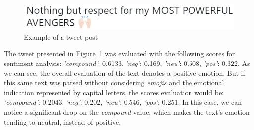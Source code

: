 
\begin{figure}[htb]
    \begin{center}
        \includegraphics[width=0.8\linewidth]{img/Twitter1.png}
    \end{center}
       \caption{Example of a tweet post} %
    \label{fig:tweet1}
\end{figure}

The tweet presented in Figure~\ref{fig:tweet1} was evaluated with the following scores for sentiment analysis: \textit{'compound'}: 0.6133, \textit{'neg'}: 0.169, \textit{'neu'}: 0.508, \textit{'pos'}: 0.322. As we can see, the overall evaluation of the text denotes a positive emotion. But if this same text was parsed without considering \textit{emojis} and the emotional indication represented by capital letters, 
the scores evaluation would be: \textit{'compound'}: 0.2043, \textit{'neg'}: 0.202, \textit{'neu'}: 0.546, \textit{'pos'}: 0.251. In this case, we can notice a significant drop on the \textit{compound} value, which makes the text's emotion tending to neutral, instead of positive.%



